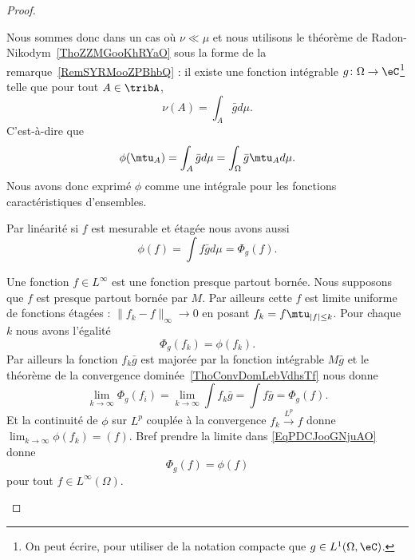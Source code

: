 \begin{proof}
\begin{subproof}

		Nous sommes donc dans un cas où \( \nu\ll\mu\) et nous utilisons le théorème de Radon-Nikodym~\ref{ThoZZMGooKhRYaO} sous la forme de la remarque~\ref{RemSYRMooZPBhbQ} : il existe une fonction intégrable \( g\colon \Omega\to \eC\)\footnote{On peut écrire, pour utiliser de la notation compacte que \(  g\in L^1(\Omega,\eC)\).} telle que pour tout \( A\in\tribA\),
		\begin{equation}
			\nu(A)=\int_A\bar gd\mu.
		\end{equation}
		C'est-à-dire que
		\begin{equation}
			\phi(\mtu_A)=\int_A\bar gd\mu=\int_{\Omega}\bar g\mtu_Ad\mu.
		\end{equation}
		Nous avons donc exprimé \( \phi\) comme une intégrale pour les fonctions caractéristiques d'ensembles.


		Par linéarité si \( f\) est mesurable et étagée nous avons aussi
		\begin{equation}
			\phi(f)=\int f\bar gd\mu=\Phi_g(f).
		\end{equation}


		Une fonction \( f\in L^{\infty}\) est une fonction presque partout bornée. Nous supposons que \( f\) est presque partout bornée par \( M\). Par ailleurs cette \( f\) est limite uniforme de fonctions étagées : \( \| f_k-f \|_{\infty}\to 0\) en posant \( f_k=f\mtu_{| f |\leq k}\). Pour chaque \( k \) nous avons l'égalité
		\begin{equation}    \label{EqPDCJooGNjuAO}
			\Phi_g(f_k)=\phi(f_k).
		\end{equation}
		Par ailleurs la fonction \( f_k\bar g\) est majorée par la fonction intégrable \( M\bar g\) et le théorème de la convergence dominée~\ref{ThoConvDomLebVdhsTf} nous donne
		\begin{equation}
			\lim_{k\to \infty} \Phi_g(f_i)=\lim_{k\to \infty} \int f_k\bar g=\int f\bar g=\Phi_g(f).
		\end{equation}
		Et la continuité de \( \phi\) sur \( L^p\) couplée à la convergence \( f_k\stackrel{L^p}{\longrightarrow}f\) donne \( \lim_{k\to \infty} \phi(f_k)=(f)\). Bref prendre la limite dans \eqref{EqPDCJooGNjuAO} donne
		\begin{equation}
			\Phi_g(f)=\phi(f)
		\end{equation}
		pour tout \( f\in L^{\infty}(\Omega)\).


\end{subproof}
\end{proof}
